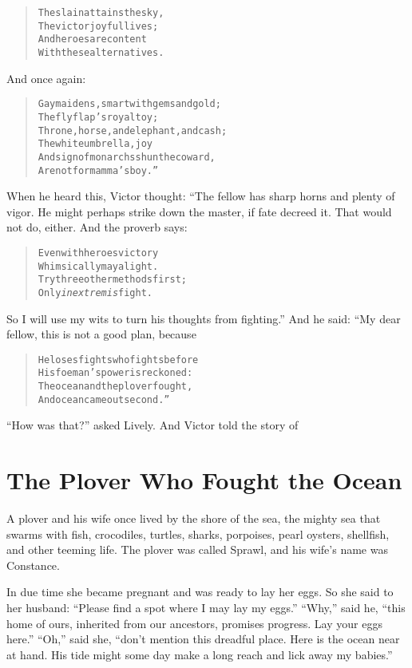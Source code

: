 \documentclass[article, twoside, 14pt]{memoir}
\renewenvironment{verbatim}{%
\begin{quote}%
\vskip -10pt%
\begin{alltt}\normalfont\large}{\end{alltt}%
\end{quote}%
\vskip -10pt
} %
\begin{document}
\begin{verbatim}
The slain attains the sky,
    The victor joyful lives;
And heroes are content
    With these alternatives.
\end{verbatim}
And once again:

\begin{verbatim}
Gay maidens, smart with gems and gold;
    The flyflap's royal toy;
Throne, horse, and elephant, and cash;
    The white umbrella, joy
And sign of monarchs{\textemdash}shun the coward,
    Are not for mamma's boy.”
\end{verbatim}
When he heard this, Victor thought: “The fellow has sharp horns and
plenty of vigor. He might perhaps strike down the master, if fate
decreed it. That would not do, either. And the proverb says:

\begin{verbatim}
Even with heroes victory
    Whimsically may alight.
Try three other methods first;
    Only \emph{in extremis} fight.
\end{verbatim}
So I will use my wits to turn his thoughts from fighting.” And he
said: “My dear fellow, this is not a good plan, because

\begin{verbatim}
He loses fights who fights before
    His foeman's power is reckoned:
The ocean and the plover fought,
    And ocean came out second.”
\end{verbatim}
``How was that?'' asked Lively. And Victor told the story of

\chapter{The Plover Who Fought the Ocean}

\label{s18}

A plover and his wife once lived by the shore of the sea, the
mighty sea that swarms with fish, crocodiles, turtles, sharks,
porpoises, pearl oysters, shellfish, and other teeming life. The
plover was called Sprawl, and his wife's name was Constance.

In due time she became pregnant and was ready to lay her eggs. So
she said to her husband:
``Please find a spot where I may lay my eggs.'' ``Why,'' said he,
``this home of ours, inherited from our ancestors, promises progress. Lay your eggs here.''
``Oh,'' said she,
``don't mention this dreadful place. Here is the ocean near at hand. His tide might some day make a long reach and lick away my babies.''
\end{document}
